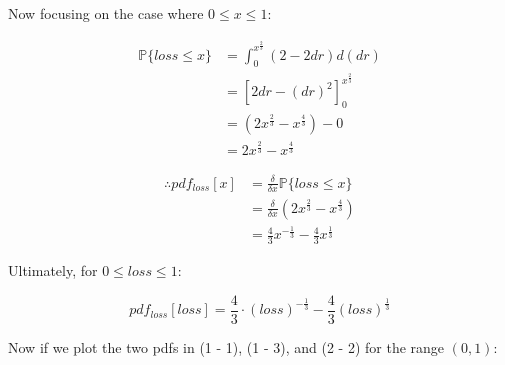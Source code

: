 \documentclass[11pt]{article}
\renewcommand{\P}{\mathbb{P}}
\begin{document}
Now focusing on the case where $0 \leq x \leq 1$:

$$
\begin{aligned}
\P\{loss \leq x\} &=
\int_0^{x^{\frac{2}{3}}} (2 - 2dr) d(dr) \\
&= \left[ 
2dr - (dr)^2
\right]_0^{x^{\frac{2}{3}}} \\
&= (2x^{\frac{2}{3}} - x^{\frac{4}{3}}) - 0 \\
&= 2x^{\frac{2}{3}} - x^{\frac{4}{3}}
\end{aligned}
$$

$$
\begin{aligned}
\therefore
pdf_{loss}[x] &= 
\frac{\delta}{\delta x} \P\{loss \leq x\} \\
&= \frac{\delta}{\delta x} (2x^{\frac{2}{3}} - x^{\frac{4}{3}}) \\
&= \frac{4}{3} x^{-\frac{1}{3}} - \frac{4}{3} x^{\frac{1}{3}}
\end{aligned}
$$

Ultimately, for $0 \leq loss \leq 1$:

\begin{equation} \tag{2 - 2}
pdf_{loss}[loss] =
\frac{4}{3} \cdot (loss)^{-\frac{1}{3}} 
-\frac{4}{3} (loss)^{\frac{1}{3}}
\end{equation}

\newpage

Now if we plot the two pdfs in (1 - 1), (1 - 3), and (2 - 2) 
for the range $(0, 1)$:
\end{document}

